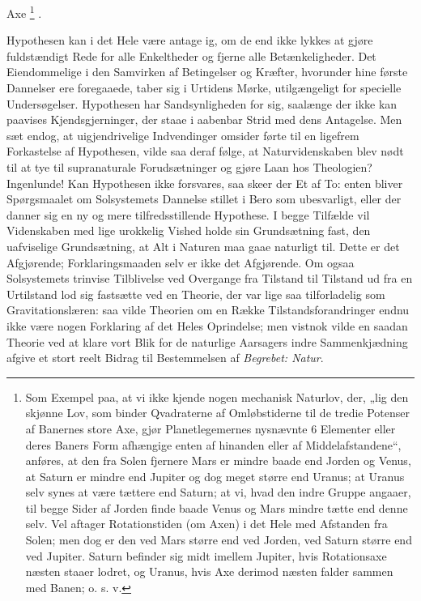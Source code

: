 \documentclass[12pt,a4paper]{book}
\renewcommand{\thefootnote}{*)}
\begin{document}
Axe%
\renewcommand{\thefootnote}{**)}%
\footnote{%
Som Exempel paa, at vi ikke kjende nogen mechanisk Naturlov, der, „lig
den skjønne Lov, som binder Qvadraterne af Omløbstiderne til de tredie
Potenser af Banernes store Axe, gjør Planetlegemernes nysnævnte 6
Elementer eller deres Baners Form afhængige enten af hinanden eller af
Middelafstandene“, anføres, at den fra Solen fjernere Mars er mindre
baade end Jorden og Venus, at Saturn er mindre end Jupiter og dog meget
større end Uranus; at Uranus selv synes at være tættere end Saturn; at
vi, hvad den indre Gruppe angaaer, til begge Sider af Jorden finde baade
Venus og Mars mindre tætte end denne selv. Vel aftager Rotationstiden
(om Axen) i det Hele med Afstanden fra Solen; men dog er den ved Mars
større end ved Jorden, ved Saturn større end ved Jupiter. Saturn
befinder sig midt imellem Jupiter, hvis Rotationsaxe næsten staaer
lodret, og Uranus, hvis Axe derimod næsten falder sammen med Banen;
o. s. v.}%
\renewcommand{\thefootnote}{*)}%
.

Hypothesen kan i det Hele være antage ig, om de end ikke lykkes at gjøre
fuldstændigt Rede for alle Enkeltheder og fjerne alle Betænkeligheder.
Det Eiendommelige i den Samvirken af Betingelser og Kræfter, hvorunder
hine første Dannelser ere foregaaede, taber sig i Urtidens Mørke,
utilgængeligt for specielle Undersøgelser. Hypothesen har
Sandsynligheden for sig, saalænge der ikke kan paavises
Kjendsgjerninger, der staae i aabenbar Strid med dens Antagelse. Men
sæt endog, at uigjendrivelige Indvendinger omsider førte til en ligefrem
Forkastelse af Hypothesen, vilde saa deraf følge, at Naturvidenskaben
blev nødt til at tye til supranaturale Forudsætninger og gjøre Laan hos
Theologien? Ingenlunde! Kan Hypothesen ikke forsvares, saa skeer der Et
af To: enten bliver Spørgsmaalet om Solsystemets Dannelse stillet i Bero
som ubesvarligt, eller der danner sig en ny og mere tilfredsstillende
Hypothese. I begge Tilfælde vil Videnskaben med lige urokkelig Vished
holde sin Grundsætning fast, den uafviselige Grundsætning, at Alt i
Naturen maa gaae naturligt til. Dette er det Afgjørende;
Forklaringsmaaden selv er ikke det Afgjørende. Om ogsaa Solsystemets
trinvise Tilblivelse ved Overgange fra Tilstand til Tilstand ud fra en
Urtilstand lod sig fastsætte ved en Theorie, der var lige saa
tilforladelig som Gravitationslæren: saa vilde Theorien om en Række
Tilstandsforandringer endnu ikke være nogen Forklaring af det Heles
Oprindelse; men vistnok vilde en saadan Theorie ved at klare vort Blik
for de naturlige Aarsagers indre Sammenkjædning afgive et stort reelt
Bidrag til Bestemmelsen af \emph{Begrebet: Natur}.
\end{document}
